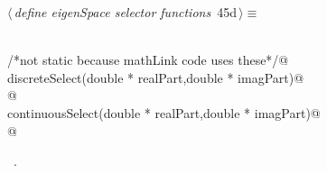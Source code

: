 \documentclass{article}
\begin{document}
\begin{flushleft} \small
\begin{minipage}{\linewidth}\label{scrap63}\raggedright\small
{} $\langle\,${\itshape define eigenSpace selector functions}\nobreak\ {\footnotesize {45d}}$\,\rangle\equiv$
\vspace{-1ex}
\begin{list}{}{} \item
\mbox{}\verb@@\\
\mbox{}\verb@/*not static because mathLink code uses these*/@\\
\mbox{}\verb@int discreteSelect(double * realPart,double * imagPart)@\\
\mbox{}@\\
\mbox{}\verb@int continuousSelect(double * realPart,double * imagPart)@\\
\mbox{}@\\
\mbox{}\verb@@{\NWsep}
\end{list}
\vspace{-1.5ex}
\footnotesize
\begin{list}{}{\setlength{\itemsep}{-\parsep}\setlength{\itemindent}{-\leftmargin}}
\item \NWtxtMacroRefIn\ .

\item{}
\end{list}
\end{minipage}\vspace{4ex}
\end{flushleft}
\end{document}
